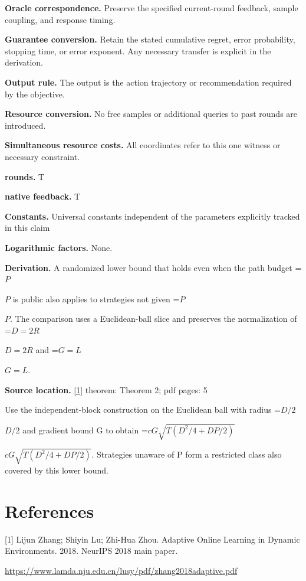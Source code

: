 \documentclass[10pt,a4paper]{article}
\newcommand{\AtlasMath}[1]{\par\begingroup\centering\setbox0=\hbox{$\displaystyle #1$}\ifdim\wd0>1.4\linewidth\typeout{ATLAS WIDE FORMULA: \the\wd0}\fi\ifdim\wd0>\linewidth\resizebox{\linewidth}{!}{\box0}\else\box0\fi\par\endgroup}
\newcommand{\AtlasInlineMath}[1]{\begingroup\setbox0=\hbox{$#1$}\ifdim\wd0>.4\linewidth\endgroup\AtlasMath{#1}\else\endgroup$#1$\fi}
\begin{document}
\textbf{Oracle correspondence.} Preserve the specified current-round feedback, sample coupling, and response timing.

\textbf{Guarantee conversion.} Retain the stated cumulative regret, error probability, stopping time, or error exponent. Any necessary transfer is explicit in the derivation.

\textbf{Output rule.} The output is the action trajectory or recommendation required by the objective.

\textbf{Resource conversion.} No free samples or additional queries to past rounds are introduced.

\textbf{Simultaneous resource costs.} All coordinates refer to this one witness or necessary constraint.

\textbf{rounds.} T

\textbf{native feedback.} T

\textbf{Constants.} Universal constants independent of the parameters explicitly tracked in this claim

\textbf{Logarithmic factors.} None.

\textbf{Derivation.} A randomized lower bound that holds even when the path budget \AtlasInlineMath{P} is public also applies to strategies not given \AtlasInlineMath{P}. The comparison uses a Euclidean-ball slice and preserves the normalization of \AtlasInlineMath{D=2R} and \AtlasInlineMath{G=L}.

\textbf{Source location.} \href{https://www.lamda.nju.edu.cn/lusy/pdf/zhang2018adaptive.pdf}{[1]} theorem: Theorem 2; pdf pages: 5

Use the independent-block construction on the Euclidean ball with radius \AtlasInlineMath{D/2} and gradient bound G to obtain \AtlasInlineMath{cG\sqrt{T(D^2/4+DP/2)}}. Strategies unaware of P form a restricted class also covered by this lower bound.

\section{References}
[1] Lijun Zhang; Shiyin Lu; Zhi-Hua Zhou. Adaptive Online Learning in Dynamic Environments. 2018. NeurIPS 2018 main paper.

\url{https://www.lamda.nju.edu.cn/lusy/pdf/zhang2018adaptive.pdf}
\end{document}

